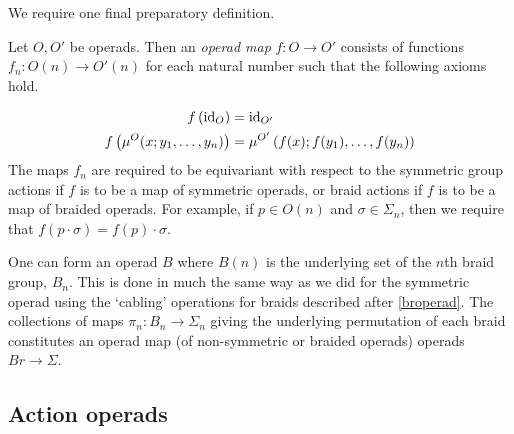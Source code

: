 We require one final preparatory definition.

\begin{Defi}\label{Defi:op_map}
Let $O,O'$ be operads. Then an \textit{operad map} $f \colon O \rightarrow O'$ consists of functions $f_{n} \colon O(n) \rightarrow O'(n)$ for each natural number such that the following axioms hold.

  \begin{align*}
    f\left(\textrm{id}_O\right) &= \textrm{id}_{O'}\\
    f\left(\mu^{O}(x;y_1,\ldots,y_n)\right) &= \mu^{O'}\left(f(x);f(y_1),\ldots,f(y_n)\right)
  \end{align*}
The maps $f_{n}$ are required to be equivariant with respect to the symmetric group actions if $f$ is to be a map of symmetric operads, or braid actions if $f$ is to be a map of braided operads. For example, if $p \in O(n)$ and $\sigma \in \Sigma_n$, then we require that $f(p \cdot \sigma) = f(p) \cdot \sigma$.
\end{Defi}


\begin{example}\label{ex:braid_operad_B}
One can form an operad $B$ where $B(n)$ is the underlying set of the $n$th braid group, $B_{n}$. This is done in much the same way as we did for the symmetric operad using the `cabling' operations for braids described after \cref{broperad}. The collections of maps $\pi_{n} \colon B_{n} \rightarrow \Sigma_{n}$ giving the underlying permutation of each braid constitutes an operad map (of non-symmetric or braided operads) operads $Br \rightarrow \Sigma$.
\end{example}

\subsection{Action operads}


